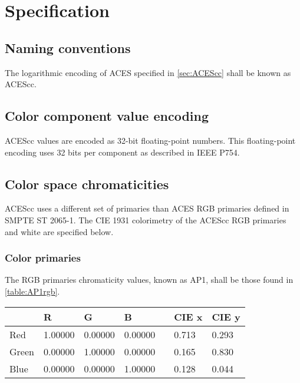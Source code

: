 \regularsectionformat	%
\chapter{Specification}

\section{Naming conventions}
The logarithmic encoding of ACES specified in \autoref{sec:ACEScc} shall be known as ACEScc.

\section{Color component value encoding}
ACEScc values are encoded as 32-bit floating-point numbers. This floating-point encoding uses 32 bits per component as described in IEEE P754.

\section{Color space chromaticities}
\label{sec:colorspace}
ACEScc uses a different set of primaries than ACES RGB primaries defined in SMPTE ST 2065-1. The CIE 1931 colorimetry of the ACEScc RGB primaries and white are specified below.

\subsection{Color primaries}
The RGB primaries chromaticity values, known as AP1, shall be those found in \autoref{table:AP1rgb}.

\begin{center}
\begin{tabularx}{4.5in}{XlllXll}
        & R       & G       & B       & & CIE x & CIE y \\ \hline
Red     & 1.00000 & 0.00000 & 0.00000 & & 0.713 & 0.293 \\
Green   & 0.00000 & 1.00000 & 0.00000 & & 0.165 & 0.830 \\
Blue    & 0.00000 & 0.00000 & 1.00000 & & 0.128 & 0.044 \\
\end{tabularx}
\label{table:AP1rgb}
\end{center}

